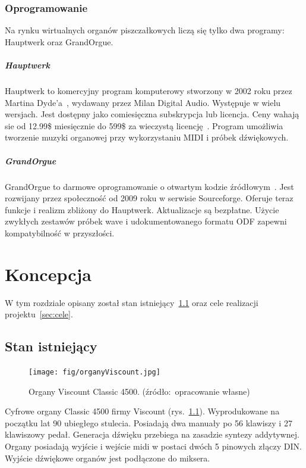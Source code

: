 \documentclass[11pt]{report}
\begin{document}
    \subsection{Oprogramowanie}

    Na rynku wirtualnych organów piszczałkowych liczą się tylko dwa programy: Hauptwerk oraz GrandOrgue.

    \paragraph{Hauptwerk}
    Hauptwerk to komercyjny program komputerowy stworzony w 2002 roku przez Martina Dyde'a~\cite{13115512220180101}, wydawany przez Milan Digital Audio.
    Występuje w wielu wersjach.
    Jest dostępny jako comiesięczna subskrypcja lub licencja.
    Ceny wahają sie od 12.99\$ miesięcznie do 599\$ za wieczystą licencję~\cite{hauptwerk}.
    Program umożliwia tworzenie muzyki organowej przy wykorzystaniu MIDI i próbek dźwiękowych.

    \paragraph{GrandOrgue}
    GrandOrgue to darmowe oprogramowanie o otwartym kodzie źródłowym~\cite{grandorgue}.
    Jest rozwijany przez społeczność od 2009 roku w serwisie Sourceforge.
    Oferuje teraz funkcje i realizm zbliżony do Hauptwerk.
    Aktualizacje są bezpłatne.
    Użycie zwykłych zestawów próbek wave i udokumentowanego formatu ODF zapewni kompatybilność w przyszłości.


    \chapter{Koncepcja}
    W tym rozdziale opisany został stan istniejący~\ref{sec:stan-istniejący} oraz cele realizacji projektu~\ref{sec:cele}.


    \section{Stan istniejący}\label{sec:stan-istniejący}

    \begin{figure}[!ht]
        \centering
        \texttt{[image: fig/organyViscount.jpg]}
        \caption{Organy Viscount Classic 4500. (źródło:~opracowanie własne)}
        \label{fig:organyViscount}
    \end{figure}

    Cyfrowe organy Classic 4500 firmy Viscount (rys.~\ref{fig:organyViscount}).
    Wyprodukowane na początku lat 90 ubiegłego stulecia.
    Posiadają dwa manuały po 56 klawiszy i 27 klawiszowy pedał.
    Generacja dźwięku przebiega na zasadzie syntezy addytywnej.
    Organy posiadają wyjście i wejście midi w postaci dwóch 5 pinowych złączy DIN.
    Wyjście dźwiękowe organów jest podłączone do miksera.
\end{document}
